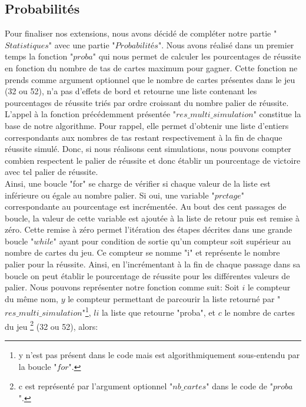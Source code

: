 \documentclass[10pt,a4paper,french,titlepage]{article}
\begin{document}
\subsection{Probabilités}
Pour finaliser nos extensions, nous avons décidé de compléter notre partie "$Statistiques$" avec une partie "$Probabilités$". Nous avons réalisé dans un premier temps la fonction "$proba$" qui nous permet de calculer les pourcentages de réussite en fonction du nombre de tas de cartes maximum pour gagner. Cette fonction
ne prends comme argument optionnel que le nombre de cartes présentes dans le jeu (32 ou 52), n'a pas d'effets de bord et retourne une liste contenant les pourcentages 
de réussite triés par ordre croissant du nombre palier de réussite. L'appel à la fonction précédemment présentée "$res\_multi\_simulation$" constitue la base de notre
algorithme. Pour rappel, elle permet d'obtenir une liste d'entiers correspondants aux nombres de tas restant respectivement à la fin de chaque réussite simulé.
Donc, si nous réalisons cent simulations, nous pouvons compter combien respectent le palier de réussite et donc établir un pourcentage de victoire avec tel palier 
de réussite.\\
Ainsi, une boucle "for" se charge de vérifier si chaque valeur de la liste est inférieure ou égale au nombre palier. Si oui, une variable "$prctage$" 
correspondante au pourcentage est incrémentée. Au bout des cent passages de boucle, la valeur de cette variable est ajoutée à la liste de retour puis est remise à 
zéro. Cette remise à zéro permet l'itération des étapes décrites dans une grande boucle "$while$" ayant pour condition de sortie qu'un compteur soit supérieur au nombre 
de cartes du jeu. Ce compteur se nomme "i" et représente le nombre palier pour la réussite. Ainsi, en l'incrémentant à la fin de chaque passage dans sa boucle on peut
établir le pourcentage de réussite pour les différentes valeurs de palier. Nous pouvons représenter notre fonction comme suit:
Soit $i$ le compteur du même nom, $y$ le compteur permettant de parcourir la liste retourné par "$res\_multi\_simulation$"\footnote{y n'est pas présent dans le code mais est algorithmiquement sous-entendu par la boucle "$for$".}, $li$ la liste que retourne "proba", et $c$ le nombre de cartes du jeu \footnote{c est représenté par l'argument optionnel "$nb\_cartes$" dans le code de "$proba$".} (32 ou 52), alors:
\end{document}
